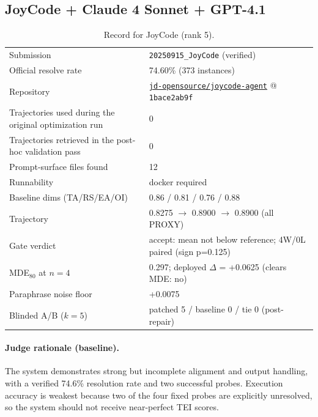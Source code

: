\subsection{JoyCode + Claude 4 Sonnet + GPT-4.1}
\label{app:agent5}
\begin{table}[H]\centering\scriptsize
\caption{Record for JoyCode (rank 5).}
\begin{tabular}{lp{8.2cm}}\toprule
Submission & \texttt{20250915\_\allowbreak{}JoyCode} (verified) \\
Official resolve rate & 74.60\% (373 instances) \\
Repository & \href{https://github.com/jd-opensource/joycode-agent}{\texttt{jd-opensource/joycode-agent}} @ \texttt{1bace2ab9f} \\
Trajectories used during the original optimization run & 0 \\
Trajectories retrieved in the post-hoc validation pass & 0 \\
Prompt-surface files found & 12 \\
Runnability & docker required \\
Baseline dims (TA/RS/EA/OI) & 0.86 / 0.81 / 0.76 / 0.88 \\
Trajectory & 0.8275 $\to$ 0.8900 $\to$ 0.8900 (all PROXY) \\
Gate verdict & accept: mean not below reference; 4W/0L paired (sign p=0.125) \\
MDE$_{80}$ at $n{=}4$ & 0.297; deployed $\Delta$ = +0.0625 (clears MDE: no) \\
Paraphrase noise floor & +0.0075 \\
Blinded A/B ($k{=}5$) & patched 5 / baseline 0 / tie 0 (post-repair) \\
\bottomrule\end{tabular}\end{table}
\paragraph{Judge rationale (baseline).}
The system demonstrates strong but incomplete alignment and output handling, with a verified 74.6\% resolution rate and two successful probes. Execution accuracy is weakest because two of the four fixed probes are explicitly unresolved, so the system should not receive near-perfect TEI scores.
